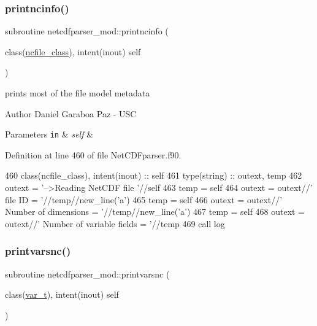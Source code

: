 \subsubsection{\texorpdfstring{printncinfo()}{printncinfo()}}
{\footnotesize\ttfamily subroutine netcdfparser\+\_\+mod\+::printncinfo (\begin{DoxyParamCaption}\item[{class(\mbox{\hyperlink{structnetcdfparser__mod_1_1ncfile__class}{ncfile\+\_\+class}}), intent(inout)}]{self }\end{DoxyParamCaption})\hspace{0.3cm}{\ttfamily [private]}}



prints most of the file model metadata 

\begin{DoxyAuthor}{Author}
Daniel Garaboa Paz -\/ U\+SC 
\end{DoxyAuthor}

\begin{DoxyParams}[1]{Parameters}
\mbox{\tt in}  & {\em self} & \\
\hline
\end{DoxyParams}


Definition at line 460 of file Net\+C\+D\+Fparser.\+f90.


\begin{DoxyCode}
460     \textcolor{keywordtype}{class}(ncfile\_class), \textcolor{keywordtype}{intent(inout)} :: self
461     \textcolor{keywordtype}{type}(string) :: outext, temp
462     outext = \textcolor{stringliteral}{'-->Reading NetCDF file '}//self%
463     temp = self%
464     outext = outext//\textcolor{stringliteral}{'       file ID = '}//temp//new\_line(\textcolor{stringliteral}{'a'})
465     temp = self%
466     outext = outext//\textcolor{stringliteral}{'       Number of dimensions = '}//temp//new\_line(\textcolor{stringliteral}{'a'})
467     temp = self%
468     outext = outext//\textcolor{stringliteral}{'       Number of variable fields = '}//temp
469     \textcolor{keyword}{call }log%
\end{DoxyCode}
\mbox{\label{namespacenetcdfparser__mod_a6b57fa47d7bd796c75483216a51e5e04}} 
\subsubsection{\texorpdfstring{printvarsnc()}{printvarsnc()}}
{\footnotesize\ttfamily subroutine netcdfparser\+\_\+mod\+::printvarsnc (\begin{DoxyParamCaption}\item[{class(\mbox{\hyperlink{structnetcdfparser__mod_1_1var__t}{var\+\_\+t}}), intent(inout)}]{self }\end{DoxyParamCaption})\hspace{0.3cm}{\ttfamily [private]}}




